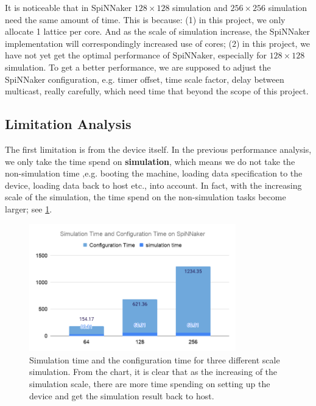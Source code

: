 It is noticeable that in SpiNNaker $128\times128$ simulation and $256\times256$ simulation need the same amount of time. This is because: (1) in this project, we only allocate 1 lattice per core. And as the scale of simulation increase, the SpiNNaker implementation will correspondingly increased use of cores; (2) in this project, we have not yet get the optimal performance of SpiNNaker, especially for $128\times128$ simulation. To get a better performance, we are supposed to adjust the SpiNNaker configuration, e.g. timer offset, time scale factor, delay between multicast, really carefully, which need time that beyond the scope of this project.


\subsection{Limitation Analysis} \label{sec:ana}
The first limitation is from the device itself. In the previous performance analysis, we only take the time spend on \textbf{simulation}, which means we do not take the non-simulation time ,e.g. booting the machine, loading data specification to the device, loading data back to host etc., into account. In fact, with the increasing scale of the simulation, the time spend on the non-simulation tasks become larger; see \ref{fig:loading}.

\begin{figure}[tb]
   \centering
       \includegraphics[width=0.8\textwidth]{figures/Simulation Time and Configuration Time on SpiNNaker.png}
       \caption{Simulation time and the configuration time for three different scale simulation. From the chart, it is clear that as the increasing of the simulation scale, there are more time spending on setting up the device and get the simulation result back to host.}
       \label{fig:loading}
\end{figure}

